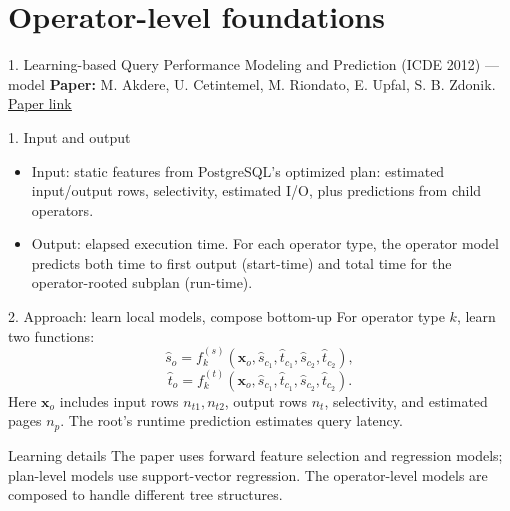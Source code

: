 \documentclass[aspectratio=169,10pt]{beamer}
\newcommand{\paperlink}[2]{\href{#1}{\textcolor{WayangTeal}{\underline{#2}}}}
\begin{document}
\section{Operator-level foundations}
\begin{frame}[shrink=10]{1. Learning-based Query Performance Modeling and Prediction (ICDE 2012) — model}
\small
\textbf{Paper:} M. Akdere, U. Cetintemel, M. Riondato, E. Upfal, S. B. Zdonik.
\hfill\paperlink{https://doi.org/10.1109/ICDE.2012.64}{Paper link}

\begin{block}{1. Input and output}
\begin{itemize}\setlength\itemsep{1pt}
  \item Input: static features from PostgreSQL's optimized plan: estimated input/output rows, selectivity, estimated I/O, plus predictions from child operators.
  \item Output: elapsed execution time. For each operator type, the operator model predicts both time to first output (start-time) and total time for the operator-rooted subplan (run-time).
\end{itemize}
\end{block}

\begin{block}{2. Approach: learn local models, compose bottom-up}
For operator type $k$, learn two functions:
\[
\widehat{s}_o=f^{(s)}_k(\mathbf x_o,\widehat{s}_{c_1},\widehat{t}_{c_1},\widehat{s}_{c_2},\widehat{t}_{c_2}),
\]
\[
\widehat{t}_o=f^{(t)}_k(\mathbf x_o,\widehat{s}_{c_1},\widehat{t}_{c_1},\widehat{s}_{c_2},\widehat{t}_{c_2}).
\]
Here $\mathbf x_o$ includes input rows $n_{t1},n_{t2}$, output rows $n_t$, selectivity, and estimated pages $n_p$. The root's runtime prediction estimates query latency.
\end{block}

\begin{block}{Learning details}
The paper uses forward feature selection and regression models; plan-level models use support-vector regression. The operator-level models are composed to handle different tree structures.
\end{block}
\end{frame}
\end{document}
